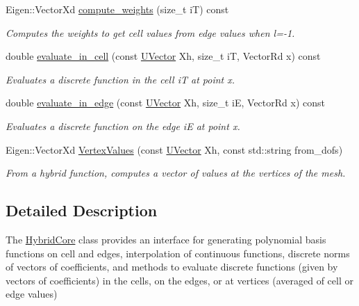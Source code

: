 \begin{DoxyCompactItemize}
\mbox{\label{classHArDCore2D_1_1HybridCore_a06825c5d156026d465a2798389aa952b}} 
Eigen\+::\+Vector\+Xd \hyperlink{classHArDCore2D_1_1HybridCore_a06825c5d156026d465a2798389aa952b}{compute\+\_\+weights} (size\+\_\+t iT) const
\begin{DoxyCompactList}\small\item\em Computes the weights to get cell values from edge values when l=-\/1. \end{DoxyCompactList}\item 
\mbox{\label{classHArDCore2D_1_1HybridCore_a9c76abf42a1d56fbf863d8258690497c}} 
double \hyperlink{classHArDCore2D_1_1HybridCore_a9c76abf42a1d56fbf863d8258690497c}{evaluate\+\_\+in\+\_\+cell} (const \hyperlink{classHArDCore2D_1_1UVector}{U\+Vector} Xh, size\+\_\+t iT, Vector\+Rd x) const
\begin{DoxyCompactList}\small\item\em Evaluates a discrete function in the cell iT at point x. \end{DoxyCompactList}\item 
\mbox{\label{classHArDCore2D_1_1HybridCore_ab43816ad8a9a91f841fdb4cea0781f54}} 
double \hyperlink{classHArDCore2D_1_1HybridCore_ab43816ad8a9a91f841fdb4cea0781f54}{evaluate\+\_\+in\+\_\+edge} (const \hyperlink{classHArDCore2D_1_1UVector}{U\+Vector} Xh, size\+\_\+t iE, Vector\+Rd x) const
\begin{DoxyCompactList}\small\item\em Evaluates a discrete function on the edge iE at point x. \end{DoxyCompactList}\item 
Eigen\+::\+Vector\+Xd \hyperlink{classHArDCore2D_1_1HybridCore_a1d33ec0786b8127a161384ecf8f04018}{Vertex\+Values} (const \hyperlink{classHArDCore2D_1_1UVector}{U\+Vector} Xh, const std\+::string from\+\_\+dofs)
\begin{DoxyCompactList}\small\item\em From a hybrid function, computes a vector of values at the vertices of the mesh. \end{DoxyCompactList}\end{DoxyCompactItemize}


\subsection{Detailed Description}
The \hyperlink{classHArDCore2D_1_1HybridCore}{Hybrid\+Core} class provides an interface for generating polynomial basis functions on cell and edges, interpolation of continuous functions, discrete norms of vectors of coefficients, and methods to evaluate discrete functions (given by vectors of coefficients) in the cells, on the edges, or at vertices (averaged of cell or edge values)

